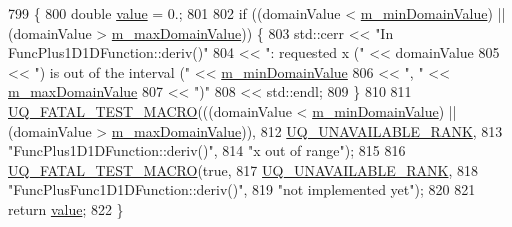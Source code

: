 \begin{DoxyCode}
799 \{
800   \textcolor{keywordtype}{double} \hyperlink{class_q_u_e_s_o_1_1_func_plus_func1_d1_d_function_a9e7a69d195d586fa982c6088ff6a7007}{value} = 0.;
801 
802   \textcolor{keywordflow}{if} ((domainValue < \hyperlink{class_q_u_e_s_o_1_1_base1_d1_d_function_a7b18b3854ee74ef5befbc67b75ebbdc5}{m\_minDomainValue}) || (domainValue > 
      \hyperlink{class_q_u_e_s_o_1_1_base1_d1_d_function_aa0025999ccab2145cd46c0a81e260e8f}{m\_maxDomainValue})) \{
803     std::cerr << \textcolor{stringliteral}{"In FuncPlus1D1DFunction::deriv()"}
804               << \textcolor{stringliteral}{": requested x ("}            << domainValue
805               << \textcolor{stringliteral}{") is out of the interval ("} << \hyperlink{class_q_u_e_s_o_1_1_base1_d1_d_function_a7b18b3854ee74ef5befbc67b75ebbdc5}{m\_minDomainValue}
806               << \textcolor{stringliteral}{", "}                         << \hyperlink{class_q_u_e_s_o_1_1_base1_d1_d_function_aa0025999ccab2145cd46c0a81e260e8f}{m\_maxDomainValue}
807               << \textcolor{stringliteral}{")"}
808               << std::endl;
809   \}
810 
811   \hyperlink{_defines_8h_a56d63d18d0a6d45757de47fcc06f574d}{UQ\_FATAL\_TEST\_MACRO}(((domainValue < \hyperlink{class_q_u_e_s_o_1_1_base1_d1_d_function_a7b18b3854ee74ef5befbc67b75ebbdc5}{m\_minDomainValue}) || (domainValue 
      > \hyperlink{class_q_u_e_s_o_1_1_base1_d1_d_function_aa0025999ccab2145cd46c0a81e260e8f}{m\_maxDomainValue})),
812                       \hyperlink{namespace_q_u_e_s_o_a7d4679800a430ae8e473c1c7bc0bfb21}{UQ\_UNAVAILABLE\_RANK},
813                       \textcolor{stringliteral}{"FuncPlus1D1DFunction::deriv()"},
814                       \textcolor{stringliteral}{"x out of range"});
815 
816   \hyperlink{_defines_8h_a56d63d18d0a6d45757de47fcc06f574d}{UQ\_FATAL\_TEST\_MACRO}(\textcolor{keyword}{true},
817                       \hyperlink{namespace_q_u_e_s_o_a7d4679800a430ae8e473c1c7bc0bfb21}{UQ\_UNAVAILABLE\_RANK},
818                       \textcolor{stringliteral}{"FuncPlusFunc1D1DFunction::deriv()"},
819                       \textcolor{stringliteral}{"not implemented yet"});
820 
821   \textcolor{keywordflow}{return} \hyperlink{class_q_u_e_s_o_1_1_func_plus_func1_d1_d_function_a9e7a69d195d586fa982c6088ff6a7007}{value};
822 \}
\end{DoxyCode}
